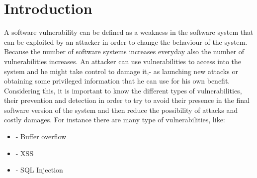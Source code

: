 \documentclass[twocolumn,10pt]{asme2ej}
\begin{document}
\section{Introduction}
A software vulnerability can be defined as a weakness in the software system that can be exploited by an attacker in order to change the behaviour of the system. Because the number of software systems increases everyday also the number of vulnerabilities increases.
An attacker can use vulnerabilities to access into the system and he might take control to damage it,- as launching new attacks or obtaining some privileged information that he can use for his own benefit. Considering this, it is important to know the different types of vulnerabilities, their prevention and detection in order to try to avoid their presence in the final software version of the system and then reduce the possibility of attacks and costly damages. For instance there are many type of vulnerabilities, like:
\begin{itemize}
    \item - Buffer overflow
    \item - XSS
    \item - SQL Injection
\end{itemize}
\end{document}
